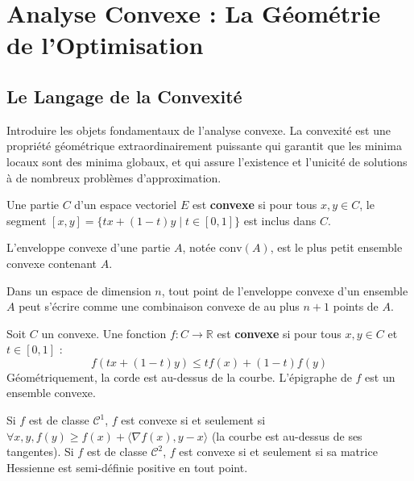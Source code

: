 \chapter{Analyse Convexe : La Géométrie de l'Optimisation}

\section{Le Langage de la Convexité}

\begin{objectif}
    Introduire les objets fondamentaux de l'analyse convexe. La convexité est une propriété géométrique extraordinairement puissante qui garantit que les minima locaux sont des minima globaux, et qui assure l'existence et l'unicité de solutions à de nombreux problèmes d'approximation.
\end{objectif}

\begin{definition}
    Une partie $C$ d'un espace vectoriel $E$ est \textbf{convexe} si pour tous $x,y \in C$, le segment $[x,y] = \{tx + (1-t)y \mid t \in [0,1]\}$ est inclus dans $C$.
\end{definition}

\begin{definition}
    L'enveloppe convexe d'une partie $A$, notée $\mathrm{conv}(A)$, est le plus petit ensemble convexe contenant $A$.
\end{definition}

\begin{theorem}
    Dans un espace de dimension $n$, tout point de l'enveloppe convexe d'un ensemble $A$ peut s'écrire comme une combinaison convexe de au plus $n+1$ points de $A$.
\end{theorem}

\begin{definition}
    Soit $C$ un convexe. Une fonction $f: C \to \mathbb{R}$ est \textbf{convexe} si pour tous $x,y \in C$ et $t \in [0,1]$ :
    $$ f(tx + (1-t)y) \le t f(x) + (1-t)f(y) $$
    Géométriquement, la corde est au-dessus de la courbe. L'épigraphe de $f$ est un ensemble convexe.
\end{definition}

\begin{proposition}
    Si $f$ est de classe $\mathcal{C}^1$, $f$ est convexe si et seulement si $\forall x,y, f(y) \ge f(x) + \langle \nabla f(x), y-x \rangle$ (la courbe est au-dessus de ses tangentes).
    Si $f$ est de classe $\mathcal{C}^2$, $f$ est convexe si et seulement si sa matrice Hessienne est semi-définie positive en tout point.
\end{proposition}

